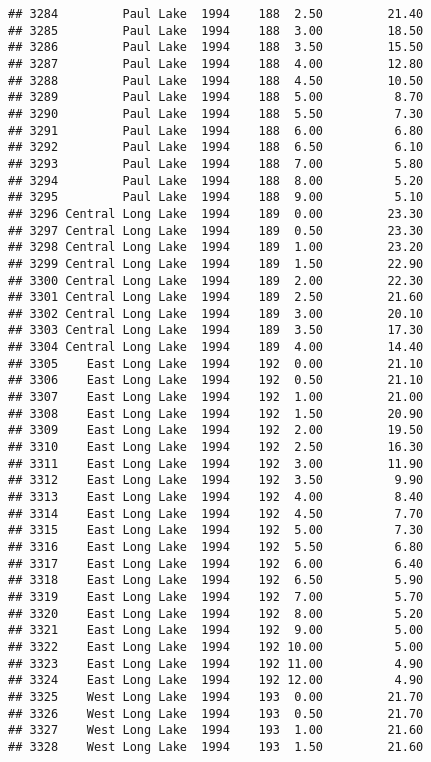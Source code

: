 \documentclass[
]{article}
\begin{document}
\begin{verbatim}
## 3284         Paul Lake  1994    188  2.50         21.40
## 3285         Paul Lake  1994    188  3.00         18.50
## 3286         Paul Lake  1994    188  3.50         15.50
## 3287         Paul Lake  1994    188  4.00         12.80
## 3288         Paul Lake  1994    188  4.50         10.50
## 3289         Paul Lake  1994    188  5.00          8.70
## 3290         Paul Lake  1994    188  5.50          7.30
## 3291         Paul Lake  1994    188  6.00          6.80
## 3292         Paul Lake  1994    188  6.50          6.10
## 3293         Paul Lake  1994    188  7.00          5.80
## 3294         Paul Lake  1994    188  8.00          5.20
## 3295         Paul Lake  1994    188  9.00          5.10
## 3296 Central Long Lake  1994    189  0.00         23.30
## 3297 Central Long Lake  1994    189  0.50         23.30
## 3298 Central Long Lake  1994    189  1.00         23.20
## 3299 Central Long Lake  1994    189  1.50         22.90
## 3300 Central Long Lake  1994    189  2.00         22.30
## 3301 Central Long Lake  1994    189  2.50         21.60
## 3302 Central Long Lake  1994    189  3.00         20.10
## 3303 Central Long Lake  1994    189  3.50         17.30
## 3304 Central Long Lake  1994    189  4.00         14.40
## 3305    East Long Lake  1994    192  0.00         21.10
## 3306    East Long Lake  1994    192  0.50         21.10
## 3307    East Long Lake  1994    192  1.00         21.00
## 3308    East Long Lake  1994    192  1.50         20.90
## 3309    East Long Lake  1994    192  2.00         19.50
## 3310    East Long Lake  1994    192  2.50         16.30
## 3311    East Long Lake  1994    192  3.00         11.90
## 3312    East Long Lake  1994    192  3.50          9.90
## 3313    East Long Lake  1994    192  4.00          8.40
## 3314    East Long Lake  1994    192  4.50          7.70
## 3315    East Long Lake  1994    192  5.00          7.30
## 3316    East Long Lake  1994    192  5.50          6.80
## 3317    East Long Lake  1994    192  6.00          6.40
## 3318    East Long Lake  1994    192  6.50          5.90
## 3319    East Long Lake  1994    192  7.00          5.70
## 3320    East Long Lake  1994    192  8.00          5.20
## 3321    East Long Lake  1994    192  9.00          5.00
## 3322    East Long Lake  1994    192 10.00          5.00
## 3323    East Long Lake  1994    192 11.00          4.90
## 3324    East Long Lake  1994    192 12.00          4.90
## 3325    West Long Lake  1994    193  0.00         21.70
## 3326    West Long Lake  1994    193  0.50         21.70
## 3327    West Long Lake  1994    193  1.00         21.60
## 3328    West Long Lake  1994    193  1.50         21.60

\end{verbatim}
\end{document}
